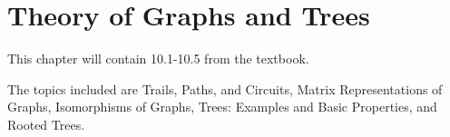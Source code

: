 \documentclass[../discrete.tex]{subfiles}
\begin{document}
\chapter{Theory of Graphs and Trees}
This chapter will contain 10.1-10.5 from the textbook.

The topics included are Trails, Paths, and Circuits, Matrix Representations of Graphs, Isomorphisms of Graphs, Trees: Examples and Basic Properties, and Rooted Trees.
\end{document}
